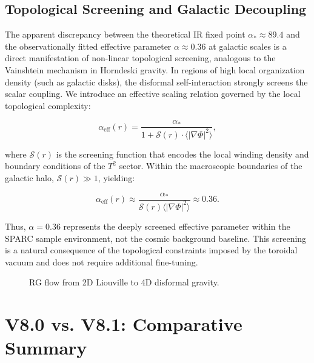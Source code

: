 \documentclass[12pt,a4paper]{article}
\numberwithin{equation}{section}
\begin{document}
\subsection{Topological Screening and Galactic Decoupling}

The apparent discrepancy between the theoretical IR fixed point $\alpha_* \approx 89.4$ and the observationally fitted effective parameter $\alpha \approx 0.36$ at galactic scales is a direct manifestation of non-linear topological screening, analogous to the Vainshtein mechanism in Horndeski gravity. In regions of high local organization density (such as galactic disks), the disformal self-interaction strongly screens the scalar coupling. We introduce an effective scaling relation governed by the local topological complexity:

\begin{equation}
\alpha_{\text{eff}}(r) = \frac{\alpha_*}{1 + \mathcal{S}(r) \cdot \langle |\nabla \Phi|^2 \rangle},
\end{equation}

where $\mathcal{S}(r)$ is the screening function that encodes the local winding density and boundary conditions of the $T^2$ sector. Within the macroscopic boundaries of the galactic halo, $\mathcal{S}(r) \gg 1$, yielding:

\begin{equation}
\alpha_{\text{eff}}(r) \approx \frac{\alpha_*}{\mathcal{S}(r) \langle |\nabla \Phi|^2 \rangle} \approx 0.36.
\end{equation}

Thus, $\alpha = 0.36$ represents the deeply screened effective parameter within the SPARC sample environment, not the cosmic background baseline. This screening is a natural consequence of the topological constraints imposed by the toroidal vacuum and does not require additional fine-tuning.

\begin{figure}[h]
\centering
{}
\caption{RG flow from 2D Liouville to 4D disformal gravity.}
\label{fig:rg}
\end{figure}

\section{V8.0 vs. V8.1: Comparative Summary}
\end{document}
